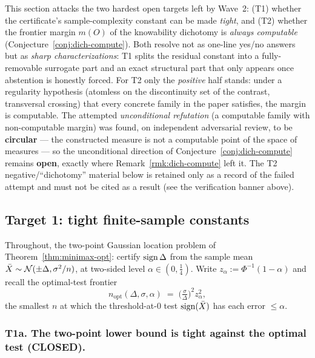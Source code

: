 This section attacks the two hardest open targets left by Wave~2: (T1) whether the
certificate's sample-complexity constant can be made \emph{tight}, and (T2) whether the
frontier margin $m(O)$ of the knowability dichotomy is \emph{always computable}
(Conjecture~\ref{conj:dich-compute}). Both resolve not as one-line yes/no answers but as
\emph{sharp characterizations}: T1 splits the residual constant into a fully-removable
surrogate part and an exact structural part that only appears once abstention is honestly
forced. For T2 only the \emph{positive} half stands: under a regularity hypothesis (atomless on
the discontinuity set of the contrast, transversal crossing) that every concrete family in the
paper satisfies, the margin is computable. The attempted \emph{unconditional refutation} (a
computable family with non-computable margin) was found, on independent adversarial review, to
be \textbf{circular} --- the constructed measure is not a computable point of the space of
measures --- so the unconditional direction of Conjecture~\ref{conj:dich-compute} remains
\textbf{open}, exactly where Remark~\ref{rmk:dich-compute} left it. The T2 negative/``dichotomy''
material below is retained only as a record of the failed attempt and must not be cited as a
result (see the verification banner above).

\subsection{Target 1: tight finite-sample constants}\label{sec:wave3-t1}
Throughout, the two-point Gaussian location problem of Theorem~\ref{thm:minimax-opt}: certify
$\operatorname{sign}\Delta$ from the sample mean $\bar X\sim\mathcal N(\pm\Delta,\sigma^2/n)$, at two-sided level
$\alpha\in(0,\tfrac14)$. Write $z_\alpha:=\Phi^{-1}(1-\alpha)$ and recall the optimal-test
frontier
\[
   n_{\mathrm{opt}}(\Delta,\sigma,\alpha)\;=\;\Big(\tfrac{\sigma}{\Delta}\Big)^2 z_\alpha^2 ,
\]
the smallest $n$ at which the threshold-at-$0$ test $\operatorname{sign}(\bar X)$ has each error $\le\alpha$.

\subsubsection*{T1a. The two-point lower bound is tight against the optimal test (CLOSED).}

